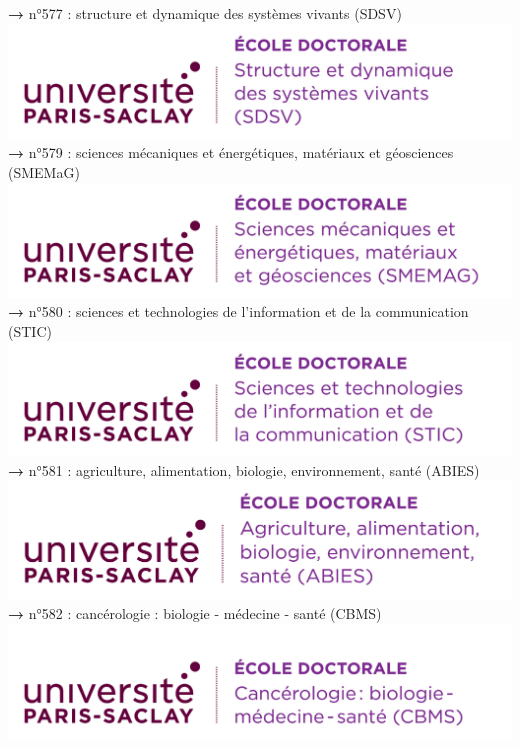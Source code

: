 \documentclass[english,12pt,a4paper]{book}
\begin{document}
\noindent \textbf{\color{Prune}→} n°577 : structure et dynamique des systèmes vivants (SDSV)\\
\includegraphics[scale=.7]{logo_usp_SDSV.png}\\

\noindent \textbf{\color{Prune}→} n°579 : sciences mécaniques et énergétiques, matériaux et géosciences  (SMEMaG)\\
\includegraphics[scale=.7]{logo_usp_SMEMAG.png}\\
\newpage
\noindent \textbf{\color{Prune}→} n°580 : sciences et technologies de l'information et de la communication (STIC)\\
\includegraphics[scale=.7]{logo_usp_STIC.png}\\

\noindent \textbf{\color{Prune}→} n°581 : agriculture, alimentation, biologie, environnement, santé (ABIES)\\
\includegraphics[scale=.7]{logo_usp_ABIES.png}\\

\noindent \textbf{\color{Prune}→} n°582 : cancérologie : biologie - médecine - santé (CBMS)\\
\includegraphics[scale=.7]{logo_usp_CBMS.png}\\
\end{document}
